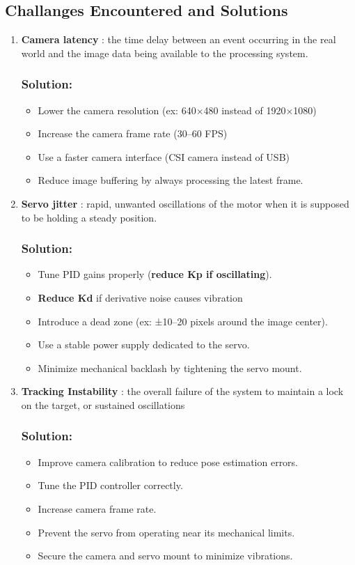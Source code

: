 \documentclass[12pt]{article}
\begin{document}
{\subsection{Challanges Encountered and Solutions}

\begin{enumerate}[label=\roman*.]
\item{\textbf{Camera latency} : the time delay between an event occurring in the real world and the image data being available to the processing system.}
\subsubsection*{Solution:}
\begin{itemize}
\item{Lower the camera resolution (ex: 640×480 instead of 1920×1080)}
\item{Increase the camera frame rate (30–60 FPS)}
\item{Use a faster camera interface (CSI camera instead of USB)}
\item{Reduce image buffering by always processing the latest frame.}
\end{itemize}
\item{\textbf{Servo jitter} : rapid, unwanted oscillations of the motor when it is supposed to be holding a steady position.}
\subsubsection*{Solution:}
\begin{itemize}
\item{Tune PID gains properly (\textbf{reduce Kp if oscillating}).}
\item{\textbf{Reduce Kd }if derivative noise causes vibration}
\item{Introduce a dead zone (ex: ±10–20 pixels around the image center).}
\item{Use a stable power supply dedicated to the servo.}
\item{Minimize mechanical backlash by tightening the servo mount.}
\end{itemize}
\item{\textbf{Tracking Instability} : the overall failure of the system to maintain a lock on the target, or sustained oscillations}
\subsubsection*{Solution:}
\begin{itemize}
\item{Improve camera calibration to reduce pose estimation errors.}
\item{Tune the PID controller correctly.}
\item{Increase camera frame rate.}
\item{Prevent the servo from operating near its mechanical limits.}
\item{Secure the camera and servo mount to minimize vibrations.}


\end{itemize}
\end{enumerate}}
\end{document}
